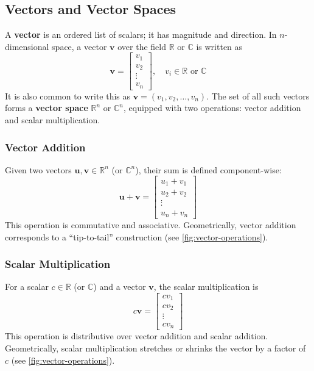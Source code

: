 \subsection{Vectors and Vector Spaces}
A \textbf{vector} is an ordered list of scalars; it has magnitude and direction. In $ n $-dimensional space, a vector $ \mathbf{v} $ over the field $ \mathbb{R} $ or $ \mathbb{C} $ is written as
\begin{equation*}
    \mathbf{v} = \begin{bmatrix} v_1 \\ v_2 \\ \vdots \\ v_n \end{bmatrix}, \quad v_i \in \mathbb{R} \text{ or } \mathbb{C}
\end{equation*}
It is also common to write this as $\mathbf{v} = (v_1, v_2, \ldots, v_n)$. The set of all such vectors forms a \textbf{vector space} $ \mathbb{R}^n $ or $ \mathbb{C}^n $, equipped with two operations: vector addition and scalar multiplication.

\subsubsection{Vector Addition}
Given two vectors $ \mathbf{u}, \mathbf{v} \in \mathbb{R}^n $ (or $ \mathbb{C}^n $), their sum is defined component-wise:
\begin{equation*}
    \mathbf{u} + \mathbf{v} = \begin{bmatrix} u_1 + v_1 \\ u_2 + v_2 \\ \vdots \\ u_n + v_n \end{bmatrix}
\end{equation*}
This operation is commutative and associative. Geometrically, vector addition corresponds to a ``tip-to-tail'' construction (see \autoref{fig:vector-operations}).

\subsubsection{Scalar Multiplication}
For a scalar $ c \in \mathbb{R} $ (or $ \mathbb{C} $) and a vector $ \mathbf{v} $, the scalar multiplication is
\begin{equation*}
    c\mathbf{v} = \begin{bmatrix} c v_1 \\ c v_2 \\ \vdots \\ c v_n \end{bmatrix}
\end{equation*}
This operation is distributive over vector addition and scalar addition. Geometrically, scalar multiplication stretches or shrinks the vector by a factor of $ c $ (see \autoref{fig:vector-operations}).

